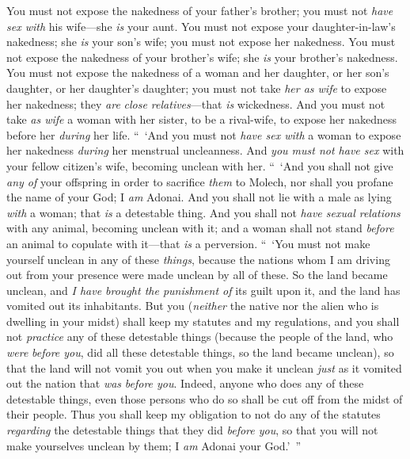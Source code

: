 \begin{biblechapter}
\verse You must not expose the nakedness of your father’s brother; you must not \textit{have sex with} his wife—she \textit{is} your aunt.
\verse You must not expose your daughter-in-law’s nakedness; she \textit{is} your son’s wife; you must not expose her nakedness.
\verse You must not expose the nakedness of your brother’s wife; she \textit{is} your brother’s nakedness.
\verse You must not expose the nakedness of a woman and her daughter, or her son’s daughter, or her daughter’s daughter; you must not take \textit{her as wife} to expose her nakedness; they \textit{are} \textit{close relatives}—that \textit{is} wickedness.
\verse And you must not take \textit{as wife} a woman with her sister, to be a rival-wife, to expose her nakedness before her \textit{during} her life.
\verse “ ‘And you must not \textit{have sex with} a woman to expose her nakedness \textit{during} her menstrual uncleanness.
\verse And \textit{you must not have sex} with your fellow citizen’s wife, becoming unclean with her.
\verse “ ‘And you shall not give \textit{any of} your offspring in order to sacrifice \textit{them} to Molech, nor shall you profane the name of your God; I \textit{am} Adonai.
\verse And you shall not lie with a male as lying \textit{with} a woman; that \textit{is} a detestable thing.
\verse And you shall not \textit{have sexual relations} with any animal, becoming unclean with it; and a woman shall not stand \textit{before} an animal to copulate with it—that \textit{is} a perversion.
\verse “ ‘You must not make yourself unclean in any of these \textit{things}, because the nations whom I am driving out from your presence were made unclean by all of these.
\verse So the land became unclean, and \textit{I have brought the punishment of} its guilt upon it, and the land has vomited out its inhabitants.
\verse But you (\textit{neither} the native nor the alien who is dwelling in your midst) shall keep my statutes and my regulations, and you shall not \textit{practice} any of these detestable things
\verse (because the people of the land, who \textit{were} \textit{before you}, did all these detestable things, so the land became unclean),
\verse so that the land will not vomit you out when you make it unclean \textit{just} as it vomited out the nation that \textit{was} \textit{before you}.
\verse Indeed, anyone who does any of these detestable things, even those persons who do so shall be cut off from the midst of their people.
\verse Thus you shall keep my obligation to not do any of the statutes \textit{regarding} the detestable things that they did \textit{before you}, so that you will not make yourselves unclean by them; I \textit{am} Adonai your God.’ ”
\end{biblechapter}

